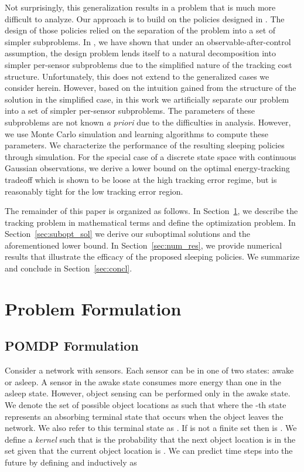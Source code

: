 \documentclass[journal,draftcls,onecolumn,11pt]{IEEEtran}
\begin{document}
Not surprisingly, this generalization results in a problem that is much more difficult to analyze. Our approach is to build on the policies designed in \cite{fuemmeler08}. The design of those policies relied on the separation of the problem into a set of simpler subproblems. In \cite{fuemmeler08}, we have shown that under an observable-after-control assumption, the design problem lends itself to a natural decomposition into simpler per-sensor subproblems due to the simplified nature of the tracking cost structure. Unfortunately, this does not extend to the generalized cases we consider herein. However, based on the intuition gained from the structure of the solution in the simplified case, in this work we artificially separate our problem into a set of simpler per-sensor subproblems. The parameters of these subproblems are not known {\em a priori} due to the difficulties in analysis. However, we use Monte Carlo simulation and learning algorithms to compute these parameters. We characterize the performance of the resulting sleeping policies through simulation. For the special case of a discrete state space with continuous Gaussian observations, we derive a lower bound on the optimal energy-tracking tradeoff which is shown to be loose at the high tracking error regime, but is reasonably tight for the low tracking error region.

The remainder of this paper is organized as follows. In Section~\ref{sec:probform}, we describe the tracking problem in mathematical terms and define the optimization problem.  In Section~\ref{sec:subopt_sol} we derive our suboptimal solutions and the aforementioned lower bound. In Section~\ref{sec:num_res}, we provide numerical results that illustrate the efficacy of the proposed sleeping policies. We summarize and conclude in Section~\ref{sec:concl}.


\section{Problem Formulation} \label{sec:probform}
\subsection{POMDP Formulation}
Consider a network with  sensors. Each sensor can be in one of two states: awake or asleep. A sensor in the awake state consumes more energy than one in the asleep state. However, object sensing can be performed only in the awake state.
We denote the set of possible object locations as  such that  where the -th state represents an absorbing terminal state that occurs when the object leaves the network.  We also refer to this terminal state as .  If  is not a finite set then  is .  We define a {\em kernel}  such that  is the probability that the next object location is in the set  given that the current object location is .  We can predict  time steps into the future by defining  and  inductively as
\end{document}
